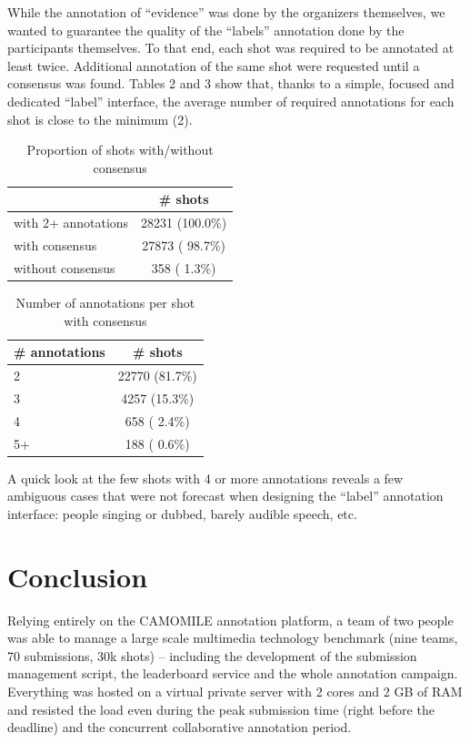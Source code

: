 \documentclass[10pt, a4paper]{article}
\begin{document}
While the annotation of ``evidence'' was done by the organizers themselves,
we wanted to guarantee the quality of the ``labels'' annotation done by the
participants themselves. To that end, each shot was required to be annotated at
least twice. Additional annotation of the same shot were requested until a
consensus was found. Tables 2 and 3 show that, thanks to a simple, focused and
dedicated ``label'' interface, the average number of required annotations
for each shot is close to the minimum (2).

\begin{table}[ht]
  \centering
  \begin{tabular}{|l|c|}
    \hline
                   		&  \# shots 			\\
    \hline
    \hline
	with 2+ annotations 	& 28231 (100.0\%) 	\\
	with consensus     	& 27873 ( 98.7\%) 	\\
	without consensus 	&   358 (  1.3\%) 	\\
    \hline
  \end{tabular}
  \caption{Proportion of shots with/without consensus}
  \label{tab:consensus1}
\end{table}


\begin{table}[ht]
  \centering
  \begin{tabular}{|l|c|}
    \hline
    \# annotations 		&  \# shots 			\\
    \hline
    \hline
	2             		& 22770 (81.7\%) \\
	3             		&  4257 (15.3\%) \\
	4             		&   658 ( 2.4\%) \\
	5+            		&   188 ( 0.6\%) \\
    \hline
  \end{tabular}
  \caption{Number of annotations per shot with consensus}
  \label{tab:consensus2}
\end{table}

A quick look at the few shots with 4 or more annotations reveals a few
ambiguous cases that were not forecast when designing the ``label'' annotation
interface: people singing or dubbed, barely audible speech, etc.

\section{Conclusion}

Relying entirely on the CAMOMILE annotation platform, a team of two people was
able to manage a large scale multimedia technology benchmark (nine teams,
70 submissions, 30k shots) -- including the development of the submission
management script, the leaderboard service and the whole annotation campaign.
Everything was hosted on a virtual private server with 2 cores and 2 GB of RAM
and resisted the load even during the peak submission time (right before the
deadline) and the concurrent collaborative annotation period.
\end{document}
